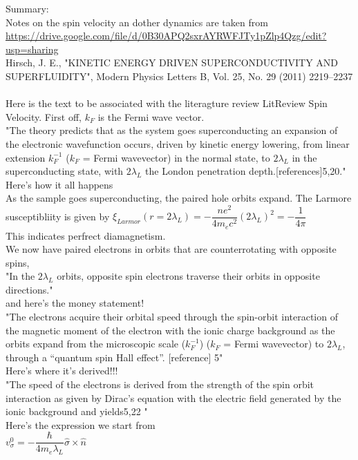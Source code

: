 \documentclass[prb,preprint]
{revtex4-1}
\begin{document}
Summary:  
\\
Notes on the spin velocity an dother dynamics are taken from 
\\
\url{https://drive.google.com/file/d/0B30APQ2sxrAYRWFJTy1pZlp4Qzg/edit?usp=sharing}
\\
Hirsch, J. E., "KINETIC ENERGY DRIVEN SUPERCONDUCTIVITY AND SUPERFLUIDITY", Modern Physics Letters B, Vol. 25, No. 29 (2011) 2219–2237
\\
\\
Here is the text to be associated with the literagture review LitReview Spin Velocity.  First off, $k_F$ is the Fermi wave vector.
\\
"The theory predicts that as the system goes superconducting an expansion
of the electronic wavefunction occurs, driven by kinetic energy lowering, from
linear extension $k^{−1}_F$
($k_F$ = Fermi wavevector) in the normal state, to $2\lambda_L$ in
the superconducting state, with $2\lambda_L$ the London penetration depth.[references]5,20."
\\
Here's how it all happens
\\
As the sample goes superconducting, the paired hole orbits expand.  The Larmore susceptibliity is given by $\xi_{Larmor}\left( r = 2\lambda_L\right) = -\dfrac{n e^2}{4 m_e c^2}\left(2 \lambda_L\right)^2 = -\dfrac{1}{4\pi}$
\\
This indicates perfrect diamagnetism.
\\
We now have paired electrons in orbits that are counterrotating with opposite spins, 
\\
"In the $2 \lambda_L$ orbits, opposite spin electrons traverse their orbits in opposite
directions."
\\
and here's the money statement!
\\
"The electrons acquire their orbital speed through the spin-orbit
interaction of the magnetic moment of the electron with the ionic charge background
as the orbits expand from the microscopic scale ($k^
{−1}_F$) ($k_F$ = Fermi wavevector) to
$2 \lambda_L$, through a “quantum spin Hall effect”. [reference] 5"
\\
Here's where it's derived!!!
\\
"The speed of the electrons is derived
from the strength of the spin orbit interaction as given by Dirac’s equation with
the electric field generated by the ionic background and yields5,22
"
\\
Here's the expression we start from
\\
$v_\sigma^0 = -\dfrac{\hbar}{4 m_e \lambda_L}\hat{\sigma} \times \hat{n}$
\end{document}
